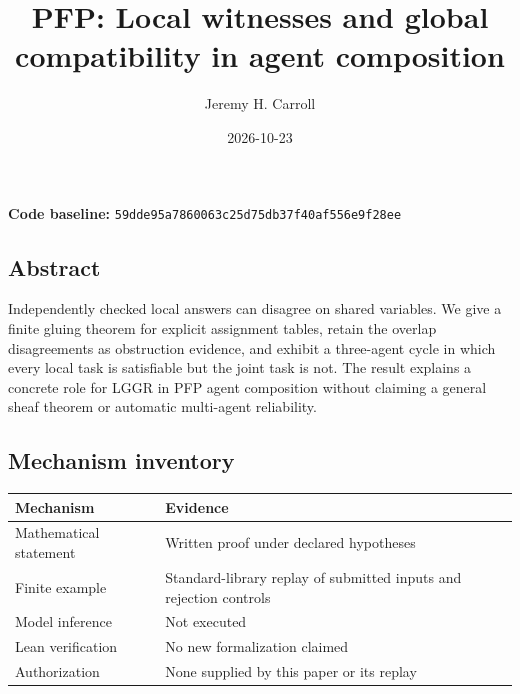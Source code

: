 \documentclass[
  11pt,
]{article}
\title{PFP: Local witnesses and global compatibility in agent
composition}
\author{Jeremy H. Carroll}
\date{2026-10-23}
\begin{document}
\makeatletter
\begin{center}
{\LARGE \@title\par}
\vspace{0.8em}
{\normalsize \@author\par}
\vspace{0.5em}
{\small \@date\par}
\end{center}
\makeatother

\textbf{Code baseline:}
\nolinkurl{59dde95a7860063c25d75db37f40af556e9f28ee}

\subsection{Abstract}\label{abstract}

Independently checked local answers can disagree on shared variables. We
give a finite gluing theorem for explicit assignment tables, retain the
overlap disagreements as obstruction evidence, and exhibit a three-agent
cycle in which every local task is satisfiable but the joint task is
not. The result explains a concrete role for LGGR in PFP agent
composition without claiming a general sheaf theorem or automatic
multi-agent reliability.

\subsection{Mechanism inventory}\label{mechanism-inventory}

\begin{longtable}[]{@{}
  >{\raggedright\arraybackslash}p{}
  >{\raggedright\arraybackslash}p{}@{}}
\toprule\noalign{}
\begin{minipage}[b]{\linewidth}\raggedright
Mechanism
\end{minipage} & \begin{minipage}[b]{\linewidth}\raggedright
Evidence
\end{minipage} \\
\midrule\noalign{}
\endhead
\bottomrule\noalign{}
\endlastfoot
Mathematical statement & Written proof under declared hypotheses \\
Finite example & Standard-library replay of submitted inputs and
rejection controls \\
Model inference & Not executed \\
Lean verification & No new formalization claimed \\
Authorization & None supplied by this paper or its replay \\
\end{longtable}
\end{document}
